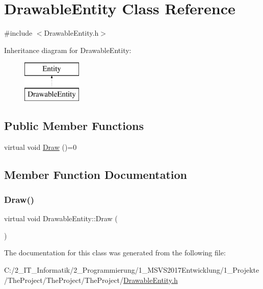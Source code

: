 \hypertarget{class_drawable_entity}{}\section{Drawable\+Entity Class Reference}
\label{class_drawable_entity}


{\ttfamily \#include $<$Drawable\+Entity.\+h$>$}

Inheritance diagram for Drawable\+Entity\+:\begin{figure}[H]
\begin{center}
\leavevmode
\includegraphics[height=2.000000cm]{class_drawable_entity}
\end{center}
\end{figure}
\subsection*{Public Member Functions}
\begin{DoxyCompactItemize}
\item 
virtual void \mbox{\hyperlink{class_drawable_entity_abc9468e7eb3c1f73eddb9d8b9ae8c93b}{Draw}} ()=0
\end{DoxyCompactItemize}


\subsection{Member Function Documentation}
\mbox{\label{class_drawable_entity_abc9468e7eb3c1f73eddb9d8b9ae8c93b}} 
\subsubsection{\texorpdfstring{Draw()}{Draw()}}
{\footnotesize\ttfamily virtual void Drawable\+Entity\+::\+Draw (\begin{DoxyParamCaption}{ }\end{DoxyParamCaption})\hspace{0.3cm}{\ttfamily [pure virtual]}}



The documentation for this class was generated from the following file\+:\begin{DoxyCompactItemize}
\item 
C\+:/2\+\_\+\+I\+T\+\_\+\+Informatik/2\+\_\+\+Programmierung/1\+\_\+\+M\+S\+V\+S2017\+Entwicklung/1\+\_\+\+Projekte/\+The\+Project/\+The\+Project/\+The\+Project/\mbox{\hyperlink{_drawable_entity_8h}{Drawable\+Entity.\+h}}\end{DoxyCompactItemize}
